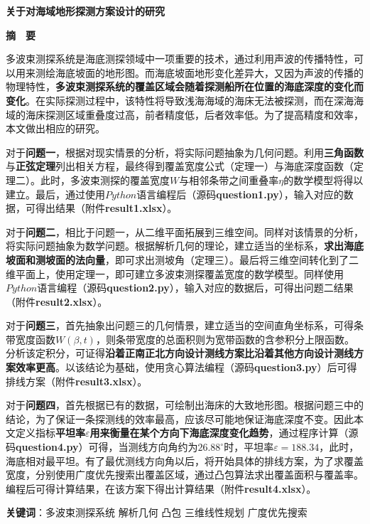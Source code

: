 \thispagestyle{empty}   %

\begin{center}
    \textbf{\fontsize{20}{1.5}关于对海域地形探测方案设计的研究}

    \textbf{摘　要}
\end{center}






多波束测探系统是海底测探领域中一项重要的技术，通过利用声波的传播特性，可以用来测绘海底坡面的地形图。而海底坡面地形变化差异大，又因为声波的传播的物理特性，\textbf{多波束测探系统的覆盖区域会随着探测船所在位置的海底深度的变化而变化}。在实际探测过程中，该特性将导致浅海海域的海床无法被探测，而在深海海域的海床探测区域重叠度过高，前者精度低，后者效率低。为了提高精度和效率，本文做出相应的研究。

对于\textbf{问题一}，根据对现实情景的分析，将实际问题抽象为几何问题。利用\textbf{三角函数}与\textbf{正弦定理}列出相关方程，最终得到覆盖宽度公式（定理一）与海底深度函数（定理二）。此时，多波束测探的覆盖宽度$W$与相邻条带之间重叠率$\eta$的数学模型将得以建立。最后，通过使用$Python$语言编程后（源码\textbf{question1.py}），输入对应的数据，可得出结果（附件\textbf{result1.xlsx}）。

对于\textbf{问题二}，相比于问题一，从二维平面拓展到三维空间。同样对该情景的分析，将实际问题抽象为数学问题。根据解析几何的理论，建立适当的坐标系，\textbf{求出海底坡面和测坡面的法向量}，即可求出测坡角（定理三）。最后将三维空间转化到了二维平面上，使用定理一，即可建立多波束测探覆盖宽度的数学模型。同样使用$Python$语言编程（源码\textbf{question2.py}），输入对应的数据后，可得出问题二结果（附件\textbf{result2.xlsx}）。

对于\textbf{问题三}，首先抽象出问题三的几何情景，建立适当的空间直角坐标系，可得条带宽度函数$W(\beta,t)$，则条带宽度的总面积则为宽带函数的含参积分上限函数。分析该定积分，可证得\textbf{沿着正南正北方向设计测线方案比沿着其他方向设计测线方案效率更高}。以该结论为基础，使用贪心算法编程（源码\textbf{question3.py}）后可得排线方案（附件\textbf{result3.xlsx}）。

对于\textbf{问题四}，首先根据已有的数据，可绘制出海床的大致地形图。根据问题三中的结论，为了保证一条探测线的效率最高，应该尽可能地保证海底深度不变。因此本文定义指标\textbf{平坦率$\varepsilon$用来衡量在某个方向下海底深度变化趋势}，通过程序计算（源码\textbf{question4.py}）可得，当测线方向角约为$26.88^\circ$时，平坦率$\varepsilon=188.34$，此时，海底相对最平坦。有了最优测线方向角以后，将开始具体的排线方案，为了求覆盖宽度，分别使用广度优先搜索出覆盖区域，通过凸包算法求出覆盖面积与覆盖率。编程后可得计算结果，在该方案下得出计算结果（附件\textbf{result4.xlsx}）。

\quad\newline
\newline
\textbf{关键词}：多波束测探系统 \quad 解析几何 \quad 凸包 \quad 三维线性规划 \quad 广度优先搜索
